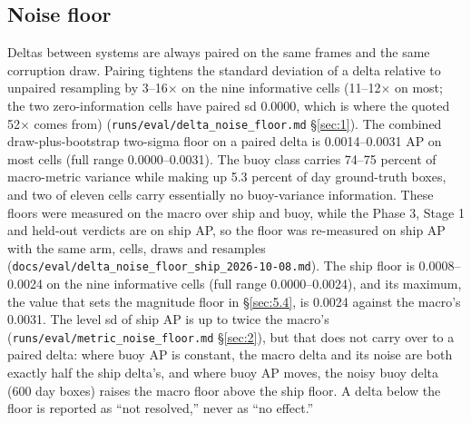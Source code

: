 \documentclass[10pt]{article}
\begin{document}
\subsection{Noise floor}\label{app:D.1}
Deltas between systems are always paired on the same frames and the same corruption draw. Pairing tightens the standard deviation of a delta relative to unpaired resampling by 3--16$\times$ on the nine informative cells (11--12$\times$ on most; the two zero-information cells have paired sd 0.0000, which is where the quoted 52$\times$ comes from) (\texttt{runs/\allowbreak{}eval/\allowbreak{}delta\_\allowbreak{}noise\_\allowbreak{}floor.md} \S\ref{sec:1}). The combined draw-plus-bootstrap two-sigma floor on a paired delta is 0.0014--0.0031 AP on most cells (full range 0.0000--0.0031). The buoy class carries 74--75 percent of macro-metric variance while making up 5.3 percent of day ground-truth boxes, and two of eleven cells carry essentially no buoy-variance information. These floors were measured on the macro over ship and buoy, while the Phase 3, Stage 1 and held-out verdicts are on ship AP, so the floor was re-measured on ship AP with the same arm, cells, draws and resamples (\texttt{docs/\allowbreak{}eval/\allowbreak{}delta\_\allowbreak{}noise\_\allowbreak{}floor\_\allowbreak{}ship\_\allowbreak{}2026-10-08.md}). The ship floor is 0.0008--0.0024 on the nine informative cells (full range 0.0000--0.0024), and its maximum, the value that sets the magnitude floor in \S\ref{sec:5.4}, is 0.0024 against the macro's 0.0031. The level sd of ship AP is up to twice the macro's (\texttt{runs/\allowbreak{}eval/\allowbreak{}metric\_\allowbreak{}noise\_\allowbreak{}floor.md} \S\ref{sec:2}), but that does not carry over to a paired delta: where buoy AP is constant, the macro delta and its noise are both exactly half the ship delta's, and where buoy AP moves, the noisy buoy delta (600 day boxes) raises the macro floor above the ship floor. A delta below the floor is reported as ``not resolved,'' never as ``no effect.''
\end{document}
